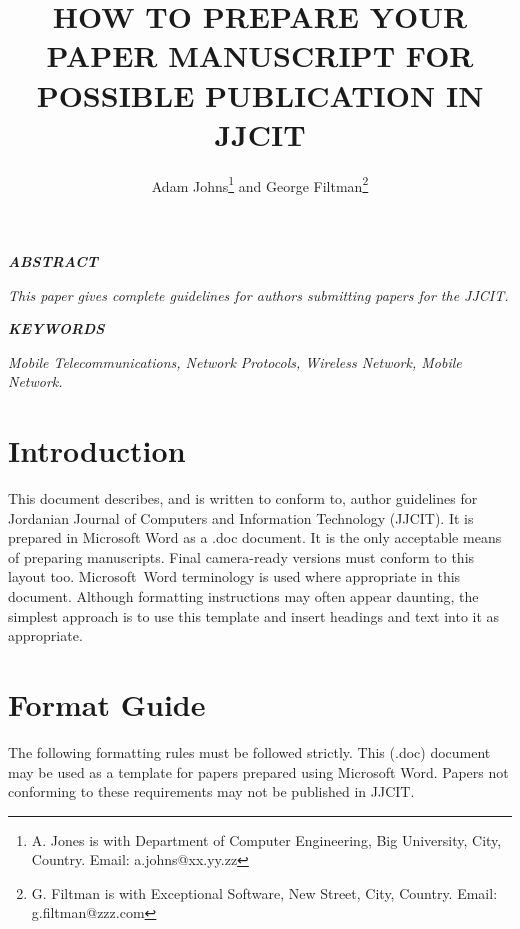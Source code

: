 \documentclass[11pt,twoside]{articleJJCIT}
\date{}
\begin{document}
\title{\fontsize{20pt}{11.0pt} \textbf{HOW TO PREPARE YOUR PAPER MANUSCRIPT FOR POSSIBLE PUBLICATION IN JJCIT}}
\setlength{\parskip}{12.0pt}\par
\author{Adam Johns\footnote{A. Jones is with Department of Computer Engineering, Big University, City, Country. Email: a.johns@xx.yy.zz} and George Filtman\footnote{G. Filtman is with Exceptional Software, New Street, City, Country. Email: g.filtman@zzz.com}}
\maketitle

{\fontsize{13pt}{11pt} \textit{\textbf{ABSTRACT}}}
\setlength{\parskip}{12.0pt}\par
\fontsize{10pt}{11.0pt}\selectfont 
{\textit{This paper gives complete guidelines for authors submitting papers for the JJCIT.}}\par
{\fontsize{13pt}{10pt} \textit{\textbf{KEYWORDS}}}\par
\setlength{\parskip}{12.0pt}
{\textit{Mobile Telecommunications, Network Protocols, Wireless Network, Mobile Network.}}


\section{Introduction}
This document describes, and is written to conform to, author guidelines for Jordanian Journal of Computers and Information Technology (JJCIT). It is prepared in Microsoft Word as a .doc document. It is the only acceptable means of preparing manuscripts. Final camera-ready versions must conform to this layout too. Microsoft\ Word terminology is used where appropriate in this document.  Although formatting instructions may often appear daunting, the simplest approach is to use this template and insert headings and text into it as appropriate.\par

\section{Format Guide}
The following formatting rules must be followed strictly. This (.doc) document may be used as a template for papers prepared using Microsoft Word. Papers not conforming to these requirements may not be published in JJCIT.
\end{document}
